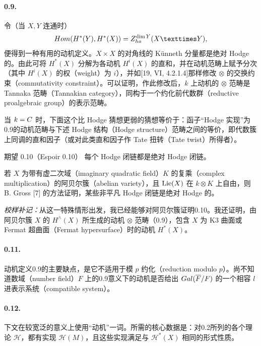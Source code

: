 \paragraph*{0.9.}
令（当 $X,Y$ 连通时）
\[
 \Hom(H^*(Y),H^*(X))=Z_{\mathrm{ha}}^{\dim Y}(X\times Y),
\]
便得到一种有用的动机定义。$X\times X$ 的对角线的 Künneth 分量都是绝对 Hodge 的。由此可将 $H^*(X)$ 分解为各动机 $H^i(X)$ 的直和，并在动机范畴上赋予分次（其中 $H^i(X)$ 的权（weight）为 $i$），并如[19, VI, 4.2.1.4]那样修改 $\otimes$ 的交换约束（commutativity constraint）。可以证明，作此修改后，$k$ 上动机的 $\otimes$ 范畴是 Tannaka 范畴（Tannakian category），同构于一个约化前代数群（reductive proalgebraic group）的表示范畴。

当 $k=C$ 时，下面这个比 Hodge 猜想更弱的猜想等价于：函子“Hodge 实现”为0.9的动机范畴与下述 Hodge 结构（Hodge structure）范畴之间的等价，即代数簇上同调的直和因子（或对此类直和因子作 Tate 扭转（Tate twist）所得者）。

\begin{originaltheorem}{期望 0.10（Espoir 0.10）}
每个 Hodge 闭链都是绝对 Hodge 闭链。
\end{originaltheorem}

若 $X$ 为带有虚二次域（imaginary quadratic field）$K$ 的复乘（complex multiplication）的阿贝尔簇（abelian variety），且 $\operatorname{Lie}(X)$ 在 $k\otimes K$ 上自由，则 B. Gross [7] 的方法证明，某些非平凡 Hodge 闭链是绝对 Hodge 的。

\emph{校样补记：}从这一特殊情形出发，我已经能够对阿贝尔簇证明0.10。我还证明，由阿贝尔簇 $X$ 的 $H^\wedge(X)$ 所生成的动机 $\otimes$ 范畴（0.9），包含 $X$ 为 K3 曲面或 Fermat 超曲面（Fermat hypersurface）时的动机 $H^*(X)$。

\paragraph*{0.11.}
动机定义0.9的主要缺点，是它不适用于模 $p$ 约化（reduction modulo $p$）。尚不知道数域（number field）$F$ 上的0.9意义下的动机是否给出 $Gal(\overline F/F)$ 的一个相容 $l$ 进表示系统（compatible system）。

\paragraph*{0.12.}
下文在较宽泛的意义上使用“动机”一词。所需的核心数据是：对0.2所列的各个理论 $\mathcal H$，都有实现 $\mathcal H(M)$，且这些实现满足与 $\mathcal H^*(X)$ 相同的形式性质。

